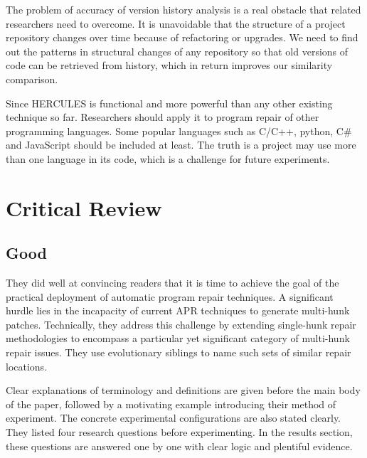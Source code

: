 \documentclass[runningheads]{llncs}
\begin{document}
The problem of accuracy of version history analysis is a real obstacle that related researchers need to overcome. It is unavoidable that the structure of a project repository changes over time because of refactoring or upgrades. We need to find out the patterns in structural changes of any repository so that old versions of code can be retrieved from history, which in return improves our similarity comparison.

Since HERCULES is functional and more powerful than any other existing technique so far. Researchers should apply it to program repair of other programming languages. Some popular languages such as C/C++, python, C\# and JavaScript should be included at least. The truth is a project may use more than one language in its code, which is a challenge for future experiments.

\section{Critical Review}

\subsection{Good}
They did well at convincing readers that it is time to achieve the goal of the practical deployment of automatic program repair techniques. A significant hurdle lies in the incapacity of current APR techniques to generate multi-hunk patches. Technically, they address this challenge by extending single-hunk repair methodologies to encompass a particular yet significant category of multi-hunk repair issues. They use evolutionary siblings to name such sets of similar repair locations.

Clear explanations of terminology and definitions are given before the main body of the paper, followed by a motivating example introducing their method of experiment. The concrete experimental configurations are also stated clearly.
They listed four research questions before experimenting. In the results section, these questions are answered one by one with clear logic and plentiful evidence.
\end{document}
